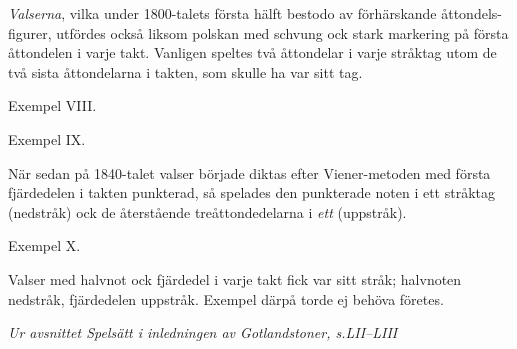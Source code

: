 \thispagestyle{empty}
\vspace*{2cm}
\begin{adjustwidth*}{19.5mm}{19.5mm}
\setlength{\parindent}{0em}

\textit{Valserna}, vilka under 1800-talets första hälft bestodo
av förhärskande åttondels-figurer, utfördes också liksom polskan
med schvung ock stark markering på första åttondelen i
varje takt. Vanligen speltes två åttondelar i varje \guillemotright{}stråktag\guillemotright{}
utom de två sista åttondelarna i takten, som skulle ha var
sitt \guillemotright{}tag\guillemotright{}.

\vspace{5mm}

Exempel VIII.


Exempel IX.


När sedan på 1840-talet valser började diktas efter Viener-metoden
med första fjärdedelen i takten punkterad, så spelades
den punkterade noten i ett \guillemotright{}stråktag\guillemotright{} (nedstråk) ock de
återstående treåttondedelarna i \textit{ett} (uppstråk).

\vspace{5mm}

Exempel X.


Valser med halvnot ock fjärdedel i varje takt fick var
sitt \guillemotright{}stråk\guillemotright{}; halvnoten nedstråk, fjärdedelen uppstråk. Exempel
därpå torde ej behöva företes.

\vspace{18mm}


\textit{Ur avsnittet \guillemotright{}Spelsätt\guillemotright{} i inledningen av Gotlandstoner, s.\@ LII--LIII}

\end{adjustwidth*}

